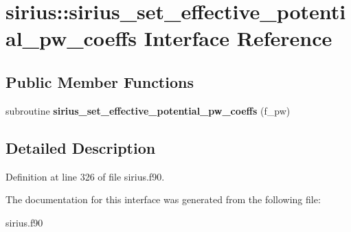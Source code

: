 \hypertarget{interfacesirius_1_1sirius__set__effective__potential__pw__coeffs}{}\section{sirius\+:\+:sirius\+\_\+set\+\_\+effective\+\_\+potential\+\_\+pw\+\_\+coeffs Interface Reference}
\label{interfacesirius_1_1sirius__set__effective__potential__pw__coeffs}
\subsection*{Public Member Functions}
\begin{DoxyCompactItemize}
\item 
\hypertarget{interfacesirius_1_1sirius__set__effective__potential__pw__coeffs_a8e8e418570ffebb6823cec34f9ed9a46}{}subroutine {\bfseries sirius\+\_\+set\+\_\+effective\+\_\+potential\+\_\+pw\+\_\+coeffs} (f\+\_\+pw)\label{interfacesirius_1_1sirius__set__effective__potential__pw__coeffs_a8e8e418570ffebb6823cec34f9ed9a46}

\end{DoxyCompactItemize}


\subsection{Detailed Description}


Definition at line 326 of file sirius.\+f90.



The documentation for this interface was generated from the following file\+:\begin{DoxyCompactItemize}
\item 
sirius.\+f90\end{DoxyCompactItemize}
